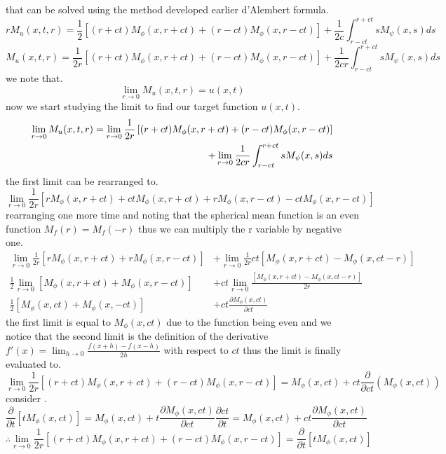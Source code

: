 \documentclass[]{article}
\begin{document}
that can be solved using the method developed earlier d'Alembert formula.
\[
    rM_u(x,t,r) = \frac{1}{2}\left[(r+ct)M_\phi(x,r+ct)+(r-ct)M_\phi(x,r-ct)\right]+\frac{1}{2c}\int_{r-ct}^{r+ct} sM_\psi(x,s)ds    
\]
\begin{equation}
M_u(x,t,r) = \frac{1}{2r}\left[(r+ct)M_\phi(x,r+ct)+(r-ct)M_\phi(x,r-ct)\right]+\frac{1}{2cr}\int_{r-ct}^{r+ct} sM_\psi(x,s)ds
\end{equation}
we note that.
\[
\lim_{r\to 0} M_u(x,t,r) = u(x,t)    
\]
now we start studying the limit to find our target function $u(x,t)$.
\begin{align}
\lim_{r\to 0} M_u(x,t,r) = \lim_{r\to 0}\frac{1}{2r}\left[(r+ct)M_\phi(x,r+ct)+(r-ct)M_\phi(x,r-ct)\right] \notag
\\
+\lim_{r\to 0}\frac{1}{2cr}\int_{r-ct}^{r+ct} sM_\psi(x,s)ds
\end{align}
the first limit can be rearranged to.
\[
    \lim_{r\to 0} \frac{1}{2r}\left[rM_\phi(x,r+ct)+ctM_\phi(x,r+ct)+rM_\phi(x,r-ct)-ctM_\phi(x,r-ct)\right]    
\]
rearranging one more time and noting that the spherical mean function is an even function $\displaystyle M_f(r)=M_f(-r)$ thus we can multiply the r variable by negative one.
\begin{align*}
    \lim_{r\to 0} \frac{1}{2r}\left[rM_\phi(x,r+ct)+rM_\phi(x,r-ct)\right] & +\lim_{r\to 0} \frac{1}{2r}ct\left[M_\phi(x,r+ct)-M_\phi(x,ct-r)\right]
    \\
    \frac{1}{2} \lim_{r\to 0} \left[M_\phi(x,r+ct)+M_\phi(x,r-ct)\right] & + ct \lim_{r\to 0} \frac{\left[M_\phi(x,r+ct)-M_\phi(x,ct-r)\right]}{2r}
    \\
    \frac{1}{2} \left[M_\phi(x,ct)+M_\phi(x,-ct)\right] & + ct \frac{\partial M_\phi(x,ct)}{\partial ct}
\end{align*}
the first limit is equal to $M_\phi(x,ct)$ due to the function being even and we notice that the second limit is the definition of the derivative$\displaystyle f'(x) = \lim_{h\to 0} \frac{f(x+h) - f(x-h)}{2h}$ with respect to $ct$ thus the limit is finally evaluated to.
\[
    \lim_{r\to 0}\frac{1}{2r}\left[(r+ct)M_\phi(x,r+ct)+(r-ct)M_\phi(x,r-ct)\right] = M_\phi(x,ct) + ct\frac{\partial}{\partial ct}(M_\phi(x,ct))    
\]
consider .
\[
    \frac{\partial}{\partial t}[tM_\phi(x,ct)] = M_\phi(x,ct)+t \frac{\partial M_\phi(x,ct)}{\partial ct}\frac{\partial ct}{\partial t} = M_\phi(x,ct)+ct \frac{\partial M_\phi(x,ct)}{\partial ct}    
\]
\[
\therefore \lim_{r\to 0}\frac{1}{2r}\left[(r+ct)M_\phi(x,r+ct)+(r-ct)M_\phi(x,r-ct)\right] = \frac{\partial}{\partial t}[tM_\phi(x,ct)]    
\]
\end{document}
